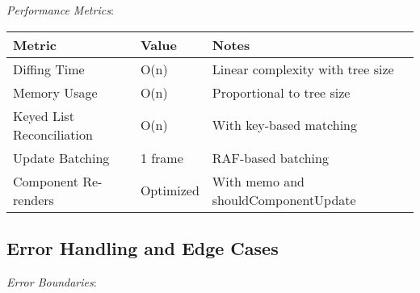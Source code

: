 \documentclass[11pt]{article}
\begin{document}
\emph{Performance Metrics}:

\begin{center}
\begin{tabular}{lll}
Metric & Value & Notes\\
\hline
Diffing Time & O(n) & Linear complexity with tree size\\
Memory Usage & O(n) & Proportional to tree size\\
Keyed List Reconciliation & O(n) & With key-based matching\\
Update Batching & 1 frame & RAF-based batching\\
Component Re-renders & Optimized & With memo and shouldComponentUpdate\\
\end{tabular}
\end{center}
\subsection{Error Handling and Edge Cases}
\label{sec:orgc1b27d7}

\emph{Error Boundaries}:
\end{document}
